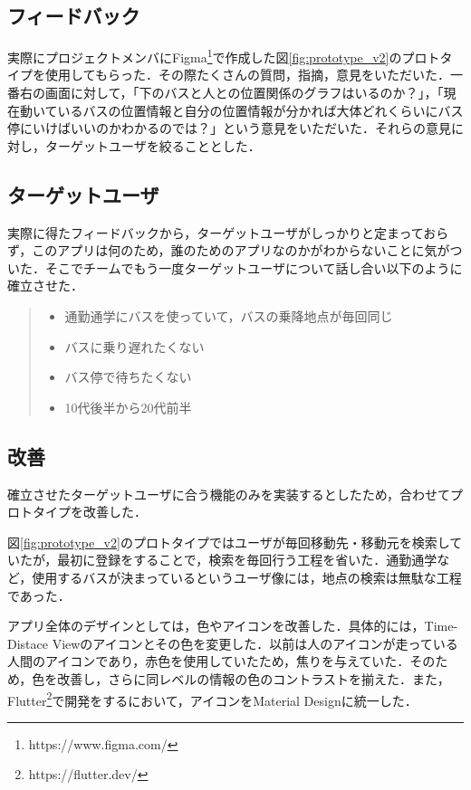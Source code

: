 \subsection{フィードバック}
実際にプロジェクトメンバにFigma\footnote{https://www.figma.com/}で作成した図\ref{fig:prototype_v2}のプロトタイプを使用してもらった．その際たくさんの質問，指摘，意見をいただいた．一番右の画面に対して，「下のバスと人との位置関係のグラフはいるのか？」，「現在動いているバスの位置情報と自分の位置情報が分かれば大体どれくらいにバス停にいけばいいのかわかるのでは？」という意見をいただいた．それらの意見に対し，ターゲットユーザを絞ることとした．

\subsection{ターゲットユーザ}
実際に得たフィードバックから，ターゲットユーザがしっかりと定まっておらず，このアプリは何のため，誰のためのアプリなのかがわからないことに気がついた．そこでチームでもう一度ターゲットユーザについて話し合い以下のように確立させた．

\begin{quote}
    \begin{itemize}
        \item 通勤通学にバスを使っていて，バスの乗降地点が毎回同じ
        \item バスに乗り遅れたくない
        \item バス停で待ちたくない
        \item 10代後半から20代前半
    \end{itemize}
\end{quote}

\subsection{改善}
確立させたターゲットユーザに合う機能のみを実装するとしたため，合わせてプロトタイプを改善した．

図\ref{fig:prototype_v2}のプロトタイプではユーザが毎回移動先・移動元を検索していたが，最初に登録をすることで，検索を毎回行う工程を省いた．通勤通学など，使用するバスが決まっているというユーザ像には，地点の検索は無駄な工程であった．

アプリ全体のデザインとしては，色やアイコンを改善した．具体的には，Time-Distace Viewのアイコンとその色を変更した．以前は人のアイコンが走っている人間のアイコンであり，赤色を使用していたため，焦りを与えていた．そのため，色を改善し，さらに同レベルの情報の色のコントラストを揃えた．また，Flutter\footnote{https://flutter.dev/}で開発をするにおいて，アイコンをMaterial Designに統一した．


